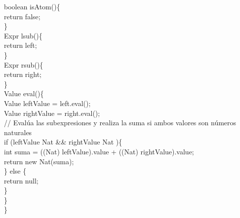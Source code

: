 \documentclass{article}
\begin{document}
\begin{itemize}
\begin{itemize}
            \hspace*{0.6cm}boolean isAtom()\{\\
            \hspace*{1.37cm}return false;\\
            \hspace*{0.6cm}\}\\
            
            \hspace*{0.6cm}Expr lsub()\{\\
            \hspace*{1.37cm}return left;\\
            \hspace*{0.6cm}\}\\
            
            \hspace*{0.6cm}Expr rsub()\{\\
            \hspace*{1.37cm}return right;\\
            \hspace*{0.6cm}\}\\
            
            \hspace*{0.6cm}Value eval()\{\\
            \hspace*{1.37cm}Value leftValue = left.eval();\\
            \hspace*{1.37cm}Value rightValue = right.eval();\\
            \hspace*{1.37cm}// Evalúa las subexpresiones y realiza la suma si ambos valores son números naturales\\
            \hspace*{1.37cm}if (leftValue Nat \&\& rightValue Nat )\{\\
            \hspace*{1.97cm}int suma = ((Nat) leftValue).value +  ((Nat) rightValue).value;\\
            \hspace*{1.97cm}return new Nat(suma);\\
            \hspace*{1.37cm}\} else \{\\
            \hspace*{1.97cm}return null;\\
            \hspace*{1.37cm}\}\\
            \hspace*{0.6cm}\}\\
            \}\\
            

\end{itemize}
\end{itemize}
\end{document}
